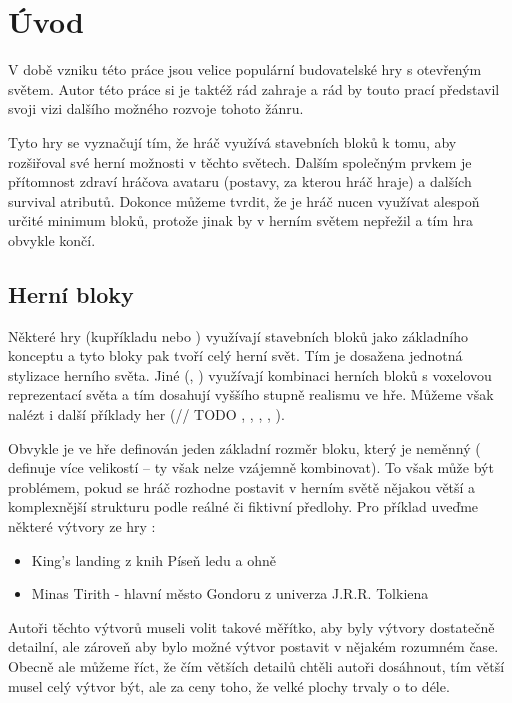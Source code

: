 
\chapter{Úvod}

V době vzniku této práce jsou velice populární budovatelské hry s otevřeným světem. Autor této práce si je taktéž rád zahraje a rád by touto prací představil svoji vizi dalšího možného rozvoje tohoto žánru.

Tyto hry se vyznačují tím, že hráč využívá stavebních bloků k tomu, aby rozšiřoval své herní možnosti v těchto světech. Dalším společným prvkem je přítomnost zdraví hráčova avataru (postavy, za kterou hráč hraje) a dalších survival atributů. Dokonce můžeme tvrdit, že je hráč nucen využívat alespoň určité minimum bloků, protože jinak by v herním světem nepřežil a tím hra obvykle končí. \\

\section{Herní bloky}

Některé hry (kupříkladu \MC{} nebo \TE{}) využívají stavebních bloků jako základního konceptu a tyto bloky pak tvoří celý herní svět. Tím je dosažena jednotná stylizace herního světa. Jiné (\SE{}, \ME{}) využívají kombinaci herních bloků s voxelovou reprezentací světa a tím dosahují vyššího stupně realismu ve hře.
Můžeme však nalézt i další příklady her (// TODO \TM{}, \NI{}, \PN{}, \ARK{}, \NMS{}).

Obvykle je ve hře definován jeden základní rozměr bloku, který je neměnný (\SE{} definuje více velikostí -- ty však nelze vzájemně kombinovat). To však může být problémem, pokud se hráč rozhodne postavit v herním světě nějakou větší a komplexnější strukturu podle reálné či fiktivní předlohy. Pro příklad uveďme některé výtvory ze hry \MC{}:
\begin{itemize}
	\item King's landing z knih Píseň ledu a ohně
	\item Minas Tirith - hlavní město Gondoru z univerza J.R.R. Tolkiena
\end{itemize}

Autoři těchto výtvorů museli volit takové měřítko, aby byly výtvory dostatečně detailní, ale zároveň aby bylo možné výtvor postavit v nějakém rozumném čase. Obecně ale můžeme říct, že čím větších detailů chtěli autoři dosáhnout, tím větší musel celý výtvor být, ale za ceny toho, že velké plochy trvaly o to déle.

